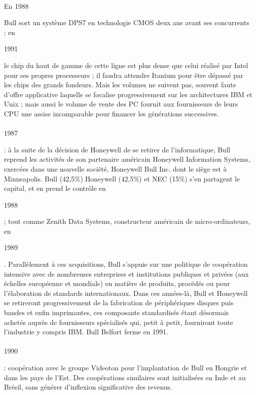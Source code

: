 \documentclass[11pt]{article}
\begin{document}
		\paragraph{}
		\begin{bf}En 1988\end{bf} Bull sort un système DPS7 en technologie CMOS deux ans avant ses concurrents ; en 
		\begin{bf}1991\end{bf} le chip du haut de gamme de cette ligne est plus dense que celui réalisé par Intel pour ses 
		propres processeurs ; il faudra attendre Itanium pour être dépassé par les chips des grands fondeurs. Mais les volumes 
		ne suivent pas, souvent faute d’offre applicative laquelle se focalise progressivement sur les architectures IBM et 
		Unix ; mais aussi le volume de vente des PC fournit aux fournisseurs de leurs CPU une assise incomparable pour 
		financer les générations successives.
		\paragraph{}
		\begin{bf}1987\end{bf}: à la suite de la décision de Honeywell de se retirer de l’informatique, Bull reprend les 
		activités de son partenaire américain Honeywell Information Systems, exercées dans une nouvelle société, Honeywell 
		Bull Inc. dont le siège est à Minneapolis. Bull (42,5\%) Honeywell (42,5\%) et NEC (15\%) s'en partagent le capital, 
		et en prend le contrôle en \begin{bf}1988\end{bf} ; tout comme Zenith Data Systems, constructeur américain de 
		micro-ordinateurs, en \begin{bf}1989\end{bf}. Parallèlement à ces acquisitions, Bull s’appuie sur une politique de 
		coopération intensive avec de nombreuses entreprises et institutions publiques et privées (aux échelles européenne et 
		mondiale) en matière de produits, procédés ou pour l’élaboration de standards internationaux.\newline{}
		Dans ces années-là, Bull et Honeywell se retireront progressivement de la fabrication de périphériques disques puis 
		bandes et enfin imprimantes, ces composants standardisés étant désormais achetés auprès de fournisseurs spécialisés 
		qui, petit à petit, fourniront toute l’industrie y compris IBM. Bull Belfort ferme en 1991.
		\paragraph{}
		\begin{bf}1990\end{bf}: coopération avec le groupe Videoton pour l’implantation de Bull en Hongrie et dans les pays 
		de l’Est. Des coopérations similaires sont initialisées en Inde et au Brésil, sans générer d’inflexion significative 
		des revenus. 
\end{document}
